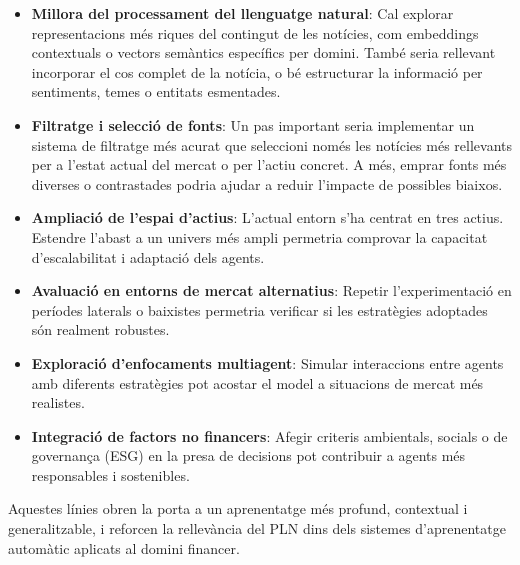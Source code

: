 \documentclass[12pt,a4paper,twoside]{book}
\begin{document}
\begin{itemize}
    \item \textbf{Millora del processament del llenguatge natural}: Cal explorar representacions més riques del contingut de les notícies, com embeddings contextuals o vectors semàntics específics per domini. També seria rellevant incorporar el cos complet de la notícia, o bé estructurar la informació per sentiments, temes o entitats esmentades.
    \item \textbf{Filtratge i selecció de fonts}: Un pas important seria implementar un sistema de filtratge més acurat que seleccioni només les notícies més rellevants per a l’estat actual del mercat o per l’actiu concret. A més, emprar fonts més diverses o contrastades podria ajudar a reduir l’impacte de possibles biaixos.
    \item \textbf{Ampliació de l’espai d’actius}: L’actual entorn s’ha centrat en tres actius. Estendre l’abast a un univers més ampli permetria comprovar la capacitat d’escalabilitat i adaptació dels agents.
    \item \textbf{Avaluació en entorns de mercat alternatius}: Repetir l’experimentació en períodes laterals o baixistes permetria verificar si les estratègies adoptades són realment robustes.
    \item \textbf{Exploració d’enfocaments multiagent}: Simular interaccions entre agents amb diferents estratègies pot acostar el model a situacions de mercat més realistes.
    \item \textbf{Integració de factors no financers}: Afegir criteris ambientals, socials o de governança (ESG) en la presa de decisions pot contribuir a agents més responsables i sostenibles.
\end{itemize}

Aquestes línies obren la porta a un aprenentatge més profund, contextual i generalitzable, i reforcen la rellevància del PLN dins dels sistemes d’aprenentatge automàtic aplicats al domini financer.
\end{document}
